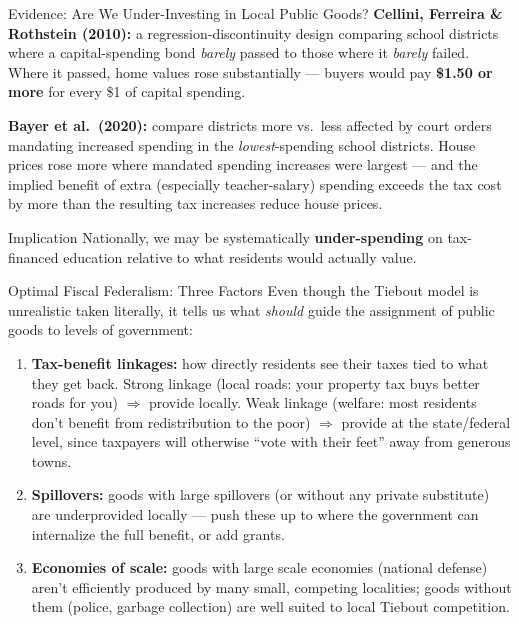\documentclass[11pt,aspectratio=169]{beamer}
\begin{document}
\begin{frame}{Evidence: Are We Under-Investing in Local Public Goods?}
  \small
  \textbf{Cellini, Ferreira \& Rothstein (2010):} a regression-discontinuity design comparing school districts where a capital-spending bond \emph{barely} passed to those where it \emph{barely} failed. Where it passed, home values rose substantially --- buyers would pay \textbf{\$1.50 or more} for every \$1 of capital spending.
  \vspace{0.3em}

  \textbf{Bayer et al.\ (2020):} compare districts more vs.\ less affected by court orders mandating increased spending in the \emph{lowest}-spending school districts. House prices rose more where mandated spending increases were largest --- and the implied benefit of extra (especially teacher-salary) spending exceeds the tax cost by more than the resulting tax increases reduce house prices.
  \begin{alertblock}{Implication}
    Nationally, we may be systematically \textbf{under-spending} on tax-financed education relative to what residents would actually value.
  \end{alertblock}
\end{frame}

\begin{frame}{Optimal Fiscal Federalism: Three Factors}
  \small
  Even though the Tiebout model is unrealistic taken literally, it tells us what \emph{should} guide the assignment of public goods to levels of government:
  \begin{enumerate}
    \setlength{\itemsep}{3pt}
    \item \textbf{Tax-benefit linkages:} how directly residents see their taxes tied to what they get back. Strong linkage (local roads: your property tax buys better roads for you) $\Rightarrow$ provide locally. Weak linkage (welfare: most residents don't benefit from redistribution to the poor) $\Rightarrow$ provide at the state/federal level, since taxpayers will otherwise ``vote with their feet'' away from generous towns.
    \item \textbf{Spillovers:} goods with large spillovers (or without any private substitute) are underprovided locally --- push these up to where the government can internalize the full benefit, or add grants.
    \item \textbf{Economies of scale:} goods with large scale economies (national defense) aren't efficiently produced by many small, competing localities; goods without them (police, garbage collection) are well suited to local Tiebout competition.
  \end{enumerate}
\end{frame}
\end{document}
